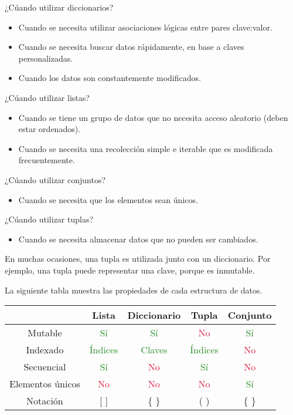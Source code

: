 \documentclass{report}
\newcommand{\si}{\textcolor{ForestGreen}{Sí}}
\newcommand{\no}{\textcolor{Crimson}{No}}
\newcommand{\indices}{\textcolor{ForestGreen}{Índices}}
\newcommand{\claves}{\textcolor{ForestGreen}{Claves}}
\begin{document}
{¿Cúando utilizar diccionarios?

\begin{itemize}
  \item Cuando se necesita utilizar asociaciones lógicas entre pares clave:valor.
  \item Cuando se necesita buscar datos rápidamente, en base a claves personalizadas.
  \item Cuando los datos son constantemente modificados.
\end{itemize}

¿Cúando utilizar listas?

\begin{itemize}
  \item Cuando se tiene un grupo de datos que no necesita acceso aleatorio (deben estar ordenados).
  \item Cuando se necesita una recolección simple e iterable que es modificada frecuentemente.
\end{itemize}

¿Cúando utilizar conjuntos?

\begin{itemize}
  \item Cuando se necesita que los elementos sean únicos.
\end{itemize}

¿Cúando utilizar tuplas?

\begin{itemize}
  \item Cuando se necesita almacenar datos que no pueden ser cambiados.
\end{itemize}

En muchas ocasiones, una tupla es utilizada junto con un diccionario. Por ejemplo, una tupla puede representar una clave, porque es inmutable.

La siguiente tabla muestra las propiedades de cada estructura de datos.


\begin{center}
  \begin{tabular}{ |c|c|c|c|c| }
    \hline
    & Lista & Diccionario & Tupla & Conjunto \\
    \hline
    Mutable & \si & \si & \no & \si \\
    \hline
    Indexado & \indices & \claves & \indices & \no \\
    \hline
    Secuencial & \si & \no & \si & \no \\
    \hline
    Elementos únicos & \no & \no & \no & \si \\
    \hline
    Notación & [ ] & \{ \} & ( ) & \{ \} \\
    \hline
  \end{tabular}
\end{center}

}
\end{document}
